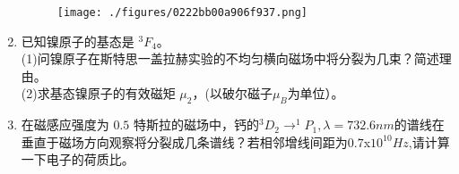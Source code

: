 \begin{enumerate}
\begin{figure}[ht]
\centering
\texttt{[image: ./figures/0222bb00a906f937.png]}
\caption{} \label{fig_ZKYP03_5}
\end{figure}
\item 已知镍原子的基态是 $ ^{3}F_4$。\\
(1)问镍原子在斯特思一盖拉赫实验的不均匀横向磁场中将分裂为几束？简述理由。\\
(2)求基态镍原子的有效磁矩 $\mu_2$，(以破尔磁子$\mu_B$为单位）。
\item 在磁感应强度为 $0.5$ 特斯拉的磁场中，钙的$^{3}D_2 \to ^1 P_1  ,\lambda=732.6nm$的谱线在垂直于磁场方向观察将分裂成几条谱线？若相邻增线间距为$0.7$x$10^{10}Hz$,请计算一下电子的荷质比。
\end{enumerate}
